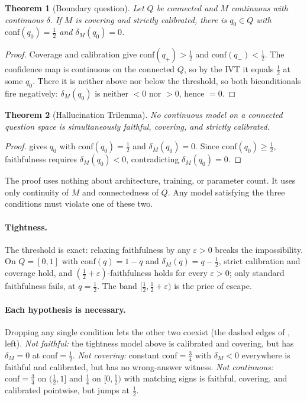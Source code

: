 \documentclass[10pt]{article}
\newtheorem{theorem}{Theorem}[section]
\newcommand{\conf}{\mathrm{conf}}
\begin{document}
\begin{theorem}[Boundary question]\label{thm:boundary}
Let $Q$ be connected and $M$ continuous with continuous $\delta$. If $M$ is
covering and strictly calibrated, there is $q_0\in Q$ with $\conf(q_0)=\tfrac12$
and $\delta_M(q_0)=0$.
\end{theorem}
\begin{proof}
Coverage and calibration give $\conf(q_+)>\tfrac12$ and $\conf(q_-)<\tfrac12$.
The confidence map is continuous on the connected $Q$, so by the IVT it equals
$\tfrac12$ at some $q_0$. There it is neither above nor below the threshold, so
both biconditionals fire negatively: $\delta_M(q_0)$ is neither $<0$ nor $>0$,
hence $=0$.
\end{proof}

\begin{theorem}[Hallucination Trilemma]\label{thm:trilemma}
No continuous model on a connected question space is simultaneously faithful,
covering, and strictly calibrated.
\end{theorem}
\begin{proof}
 gives $q_0$ with $\conf(q_0)=\tfrac12$ and
$\delta_M(q_0)=0$. Since $\conf(q_0)\ge\tfrac12$, faithfulness requires
$\delta_M(q_0)<0$, contradicting $\delta_M(q_0)=0$.
\end{proof}

The proof uses nothing about architecture, training, or parameter count. It
uses only continuity of $M$ and connectedness of $Q$. Any model satisfying the
three conditions must violate one of these two.

\paragraph{Tightness.}
\label{par:tightness}
The threshold is exact: relaxing faithfulness by any $\varepsilon>0$ breaks the
impossibility. On $Q=[0,1]$ with $\conf(q)=1-q$ and $\delta_M(q)=q-\tfrac12$,
strict calibration and coverage hold, and
$(\tfrac12+\varepsilon)$-faithfulness holds for every $\varepsilon>0$; only
standard faithfulness fails, at $q=\tfrac12$. The band
$[\tfrac12,\tfrac12+\varepsilon)$ is the price of escape.

\paragraph{Each hypothesis is necessary.}
\label{sec:counterexamples}
Dropping any single condition lets the other two coexist (the dashed edges of
, left).
\emph{Not faithful:} the tightness model above is calibrated and covering, but
has $\delta_M=0$ at $\conf=\tfrac12$.
\emph{Not covering:} constant $\conf=\tfrac34$ with $\delta_M<0$ everywhere is
faithful and calibrated, but has no wrong-answer witness.
\emph{Not continuous:} $\conf=\tfrac34$ on $(\tfrac12,1]$ and $\tfrac14$ on
$[0,\tfrac12)$ with matching signs is faithful, covering, and calibrated
pointwise, but jumps at $\tfrac12$.
\end{document}
